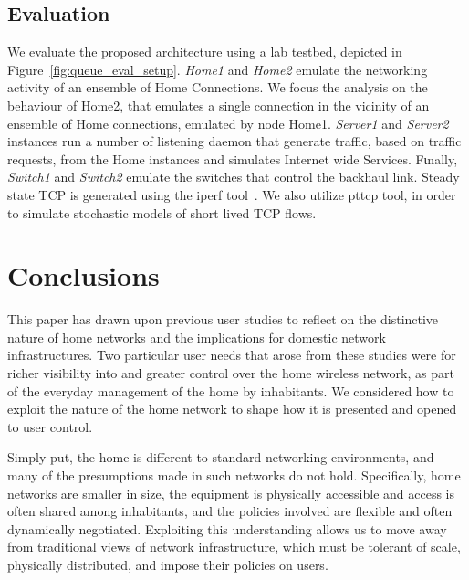 \subsection{Evaluation} \label{sec:qos_eval}


We evaluate the proposed architecture using a lab testbed, depicted in
Figure~\ref{fig:queue_eval_setup}. {\it Home1} and {\it Home2} emulate the
networking activity of an ensemble of Home Connections. We focus the
analysis on the behaviour of Home2, that emulates a single connection in the
vicinity of an ensemble of Home connections, emulated by node Home1. 
{\it Server1} and {\it Server2} instances run a number of listening daemon that
generate traffic, based on traffic requests, from the Home instances and
simulates Internet wide Services. Fιnally, {\it Switch1} and {\it  Switch2}
emulate the switches that control the backhaul link. Steady state TCP is
generated using the iperf tool~\cite{iperf}. We also utilize pttcp tool, in
order to simulate stochastic models of short lived TCP flows. 

\section{Conclusions} \label{sec:conclusion}

This paper has drawn upon previous user studies to reflect on the distinctive
nature of home networks and the implications for domestic network
infrastructures.  Two particular user needs that arose from these studies were
for richer visibility into and greater control over the home wireless network,
as part of the everyday management of the home by inhabitants.  We  considered
how to exploit the nature of the home network to shape how it is presented and
opened to user control.  

Simply put, the home is different to standard networking environments, and
many of the presumptions made in such networks do not hold.  Specifically,
home networks are smaller in size, the equipment is physically accessible and
access is often shared among inhabitants, and the policies involved are
flexible and often dynamically negotiated.  Exploiting this understanding
allows us to move away from traditional views of network infrastructure, which
must be tolerant of scale, physically distributed, and impose their policies
on users. 

